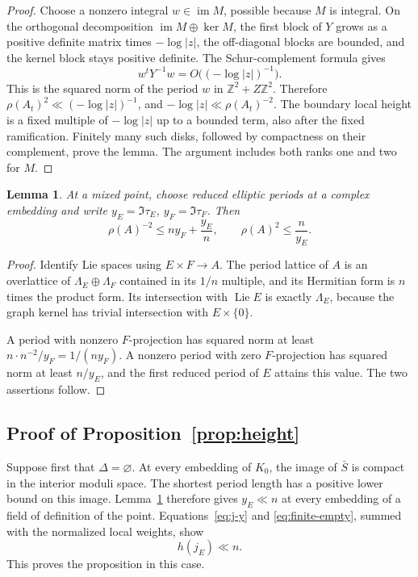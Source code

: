 \documentclass[11pt,a4paper]{article}
\numberwithin{equation}{section}
\newtheorem{lemma}[theorem]{Lemma}
\theoremstyle{definition}
\theoremstyle{remark}
\newcommand{\Z}{\mathbb Z}
\newcommand{\Lie}{\operatorname{Lie}}
\newcommand{\im}{\operatorname{im}}
\begin{document}
\begin{proof}
Choose a nonzero integral \(w\in\im M\), possible because \(M\) is
integral. On the orthogonal decomposition
\(\im M\oplus\ker M\), the first block of \(Y\) grows as a positive
definite matrix times \(-\log|z|\), the off-diagonal blocks are
bounded, and the kernel block stays positive definite.
The Schur-complement formula gives
\[
 w^tY^{-1}w=O\bigl((-\log|z|)^{-1}\bigr).
\]
This is the squared norm of the period \(w\) in
\(\Z^2+Z\Z^2\). Therefore
\(\rho(A_t)^2\ll(-\log|z|)^{-1}\), and
\(-\log|z|\ll\rho(A_t)^{-2}\).
The boundary local height is a fixed multiple of \(-\log|z|\) up to
a bounded term, also after the fixed ramification.
Finitely many such disks, followed by compactness on their
complement, prove the lemma. The argument includes both ranks
one and two for \(M\).
\end{proof}

\begin{lemma}\label{lem:rho}
At a mixed point, choose reduced elliptic periods at a complex
embedding and write \(y_E=\Im\tau_E\), \(y_F=\Im\tau_F\). Then
\[
 \rho(A)^{-2}\le ny_F+\frac{y_E}{n},
 \qquad
 \rho(A)^2\le\frac n{y_E}.
\]
\end{lemma}

\begin{proof}
Identify Lie spaces using \(E\times F\to A\).
The period lattice of \(A\) is an overlattice of
\(\Lambda_E\oplus\Lambda_F\) contained in its \(1/n\) multiple, and
its Hermitian form is \(n\) times the product form.
Its intersection with \(\Lie E\) is exactly \(\Lambda_E\),
because the graph kernel has trivial intersection with
\(E\times\{0\}\).

A period with nonzero \(F\)-projection has squared norm at least
\(n\cdot n^{-2}/y_F=1/(ny_F)\).
A nonzero period with zero \(F\)-projection has squared norm at
least \(n/y_E\), and the first reduced period of \(E\) attains this
value. The two assertions follow.
\end{proof}

\subsection{Proof of Proposition~\ref{prop:height}}

Suppose first that \(\Delta=\varnothing\).
At every embedding of \(K_0\), the image of \(\bar S\) is compact
in the interior moduli space. The shortest period length has a
positive lower bound on this image. Lemma~\ref{lem:rho} therefore
gives \(y_E\ll n\) at every embedding of a field of definition of
the point. Equations~\eqref{eq:j-y} and \eqref{eq:finite-empty},
summed with the normalized local weights, show
\[
 h(j_E)\ll n.
\]
This proves the proposition in this case.
\end{document}
